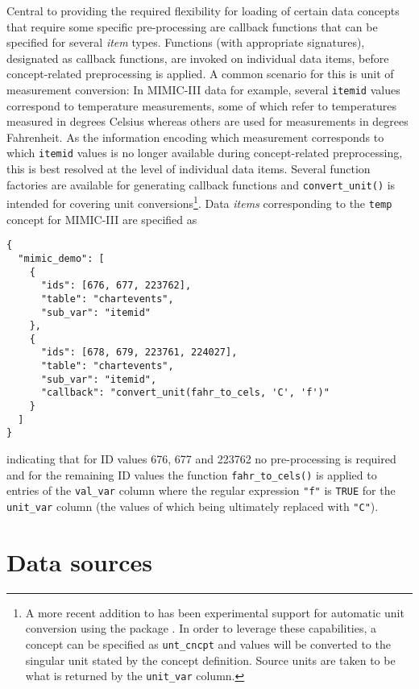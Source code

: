 \documentclass[
  notitle]{jss}
\begin{document}
Central to providing the required flexibility for loading of certain
data concepts that require some specific pre-processing are callback
functions that can be specified for several \emph{item} types. Functions
(with appropriate signatures), designated as callback functions, are
invoked on individual data items, before concept-related preprocessing
is applied. A common scenario for this is unit of measurement
conversion: In MIMIC-III data for example, several \texttt{itemid}
values correspond to temperature measurements, some of which refer to
temperatures measured in degrees Celsius whereas others are used for
measurements in degrees Fahrenheit. As the information encoding which
measurement corresponds to which \texttt{itemid} values is no longer
available during concept-related preprocessing, this is best resolved at
the level of individual data items. Several function factories are
available for generating callback functions and \texttt{convert\_unit()}
is intended for covering unit conversions\footnote{A more recent
  addition to  has been experimental support for automatic
  unit conversion using the  package \citep{pebesma2016}. In
  order to leverage these capabilities, a concept can be specified as
  \texttt{unt\_cncpt} and values will be converted to the singular unit
  stated by the concept definition. Source units are taken to be what is
  returned by the \texttt{unit\_var} column.}. Data \emph{items}
corresponding to the \texttt{temp} concept for MIMIC-III are specified
as

\begin{verbatim}
{
  "mimic_demo": [
    {
      "ids": [676, 677, 223762],
      "table": "chartevents",
      "sub_var": "itemid"
    },
    {
      "ids": [678, 679, 223761, 224027],
      "table": "chartevents",
      "sub_var": "itemid",
      "callback": "convert_unit(fahr_to_cels, 'C', 'f')"
    }
  ]
}
\end{verbatim}

indicating that for ID values 676, 677 and 223762 no pre-processing is
required and for the remaining ID values the function
\texttt{fahr\_to\_cels()} is applied to entries of the \texttt{val\_var}
column where the regular expression \texttt{"f"} is \texttt{TRUE} for
the \texttt{unit\_var} column (the values of which being ultimately
replaced with \texttt{"C"}).

\hypertarget{data-sources}{%
\section{Data sources}\label{data-sources}}
\end{document}
